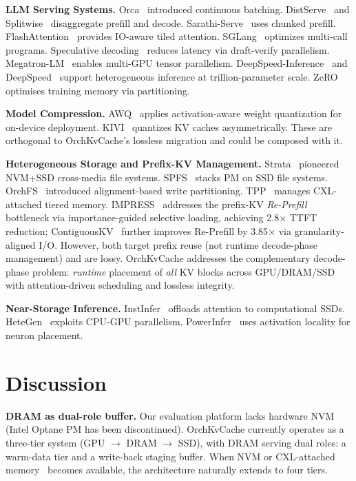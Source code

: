 \documentclass[conference]{IEEEtran}
\begin{document}
\textbf{LLM Serving Systems.} Orca~\cite{orca} introduced continuous batching. DistServe~\cite{distserve} and Splitwise~\cite{splitwise} disaggregate prefill and decode. Sarathi-Serve~\cite{sarathi} uses chunked prefill. FlashAttention~\cite{flashattn,flashattn2} provides IO-aware tiled attention. SGLang~\cite{sglang} optimizes multi-call programs. Speculative decoding~\cite{speculative} reduces latency via draft-verify parallelism. Megatron-LM~\cite{megatron} enables multi-GPU tensor parallelism. DeepSpeed-Inference~\cite{deepspeed-inf} and DeepSpeed~\cite{deepspeed} support heterogeneous inference at trillion-parameter scale. ZeRO~\cite{zero} optimises training memory via partitioning.

\textbf{Model Compression.} AWQ~\cite{awq} applies activation-aware weight quantization for on-device deployment. KIVI~\cite{kivi} quantizes KV caches asymmetrically. These are orthogonal to OrchKvCache's lossless migration and could be composed with it.

\textbf{Heterogeneous Storage and Prefix-KV Management.} Strata~\cite{strata} pioneered NVM+SSD cross-media file systems. SPFS~\cite{spfs} stacks PM on SSD file systems. OrchFS~\cite{orchfs} introduced alignment-based write partitioning. TPP~\cite{tpp} manages CXL-attached tiered memory. IMPRESS~\cite{impress} addresses the prefix-KV \emph{Re-Prefill} bottleneck via importance-guided selective loading, achieving 2.8$\times$ TTFT reduction; ContiguousKV~\cite{contiguouskv} further improves Re-Prefill by 3.85$\times$ via granularity-aligned I/O. However, both target prefix reuse (not runtime decode-phase management) and are lossy. OrchKvCache addresses the complementary decode-phase problem: \emph{runtime} placement of \emph{all} KV blocks across GPU/DRAM/SSD with attention-driven scheduling and lossless integrity.

\textbf{Near-Storage Inference.} InstInfer~\cite{instinfer} offloads attention to computational SSDs. HeteGen~\cite{hetegen} exploits CPU-GPU parallelism. PowerInfer~\cite{powerinfer} uses activation locality for neuron placement.

\section{Discussion}

\textbf{DRAM as dual-role buffer.} Our evaluation platform lacks hardware NVM (Intel Optane PM has been discontinued). OrchKvCache currently operates as a three-tier system (GPU $\to$ DRAM $\to$ SSD), with DRAM serving dual roles: a warm-data tier and a write-back staging buffer. When NVM or CXL-attached memory~\cite{tpp} becomes available, the architecture naturally extends to four tiers.
\end{document}
